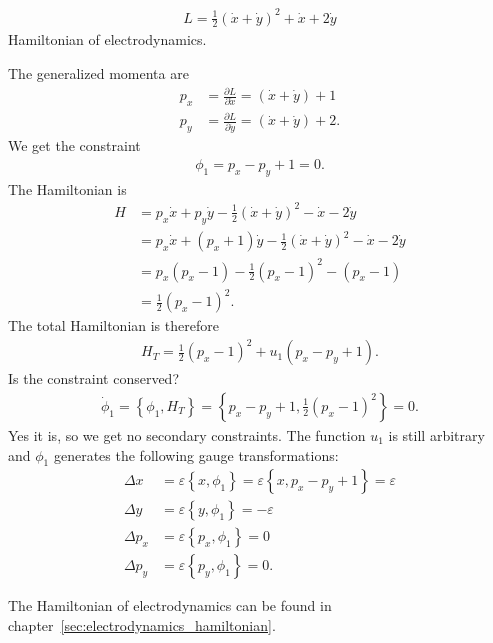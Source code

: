 \newpage

\begin{exercise}
\begin{align*}
L = \frac{1}{2} (\dot{x} + \dot{y})^2 + \dot{x} + 2 \dot{y}
\end{align*}
Hamiltonian of electrodynamics.
\end{exercise}
\begin{solution}
The generalized momenta are
\begin{align*}
p_x &= \frac{\partial L}{\partial \dot{x}} = (\dot{x} + \dot{y}) + 1 \\
p_y &= \frac{\partial L}{\partial \dot{y}} = (\dot{x} + \dot{y}) + 2.
\end{align*}
We get the constraint 
\begin{align*}
\phi_1 = p_x - p_y + 1 = 0.
\end{align*}
The Hamiltonian is
\begin{align*}
H &= p_x \dot{x} + p_y \dot{y} - \frac{1}{2} (\dot{x} + \dot{y})^2 - \dot{x} - 2 \dot{y} \\
&= p_x \dot{x} + (p_x + 1) \dot{y} - \frac{1}{2} (\dot{x} + \dot{y})^2 - \dot{x} - 2 \dot{y} \\
&= p_x (p_x - 1) - \frac{1}{2} (p_x - 1)^2 - (p_x - 1) \\
&= \frac{1}{2} (p_x - 1)^2.
\end{align*}
The total Hamiltonian is therefore
\begin{align*}
H_T = \frac{1}{2} (p_x - 1)^2 + u_1 (p_x - p_y + 1).
\end{align*}
Is the constraint conserved?
\begin{align*}
\dot{\phi}_1 = \left \{ \phi_1,H_T \right \} = \left \{ p_x - p_y + 1,\frac{1}{2} (p_x - 1)^2 \right \} = 0.
\end{align*}
Yes it is, so we get no secondary constraints. The function $u_1$ is still arbitrary and $\phi_1$ generates the following gauge transformations:
\begin{align*}
\Delta x &= \varepsilon \left \{ x,\phi_1 \right \} = \varepsilon \left \{ x,p_x - p_y + 1 \right \} = \varepsilon \\
\Delta y &= \varepsilon \left \{ y,\phi_1 \right \} = - \varepsilon \\
\Delta p_x &= \varepsilon \left \{ p_x,\phi_1 \right \} = 0 \\
\Delta p_y &= \varepsilon \left \{ p_y,\phi_1 \right \} = 0.
\end{align*}

The Hamiltonian of electrodynamics can be found in chapter~\vref{sec:electrodynamics_hamiltonian}.
\end{solution}

